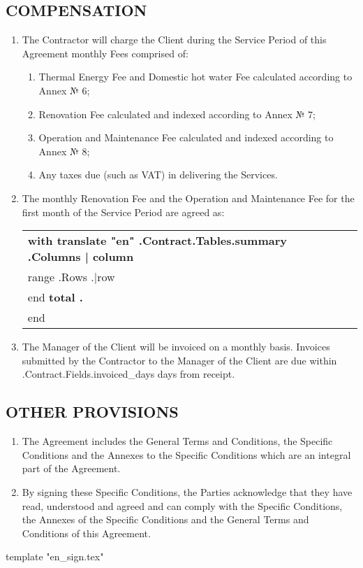 \subsection{COMPENSATION}
\begin{enumerate}
	\item	The Contractor will charge the Client during the Service Period of this Agreement monthly Fees comprised of:
	\begin{enumerate}
		\item	Thermal Energy Fee and Domestic hot water Fee calculated according to Annex № 6;
		\item	Renovation Fee calculated and indexed according to Annex № 7;
		\item	Operation and Maintenance Fee calculated and indexed according to Annex № 8;
		\item	Any taxes due (such as VAT) in delivering the Services.

	\end{enumerate}
	\item	The monthly Renovation Fee and the Operation and Maintenance Fee for the first month of the Service Period are agreed as:
\begin{center}
	\begin{tabu}{|X|X|X|X|}\tabucline{}\rowfont[c]\bfseries
	{{with translate "en" .Contract.Tables.summary}} %
	{{.Columns | column}} \\\tabucline{}
	{{range .Rows}} %
	{{.|row}} \\\tabucline{}
	{{end}}
	\bfseries {{total .}} \\\tabucline{} %
	{{end}}
	\end{tabu}
\end{center}


	\item	The Manager of the Client will be invoiced on a monthly basis. Invoices submitted by the Contractor to the Manager of the Client are due within \iffalse input fields.invoiced_days value="{{.Contract.Fields.invoiced_days}}" \fi {{.Contract.Fields.invoiced_days}} days from receipt.
\end{enumerate}

\subsection{OTHER PROVISIONS}
\begin{enumerate}
	\item	The Agreement includes the General Terms and Conditions, the Specific Conditions and the Annexes to the Specific Conditions which are an integral part of the Agreement.
	\item	By signing these Specific Conditions, the Parties acknowledge that they have read, understood and agreed and can comply with the Specific Conditions, the Annexes of the Specific Conditions and the General Terms and Conditions of this Agreement.
\end{enumerate}
{{template "en_sign.tex"}} %

